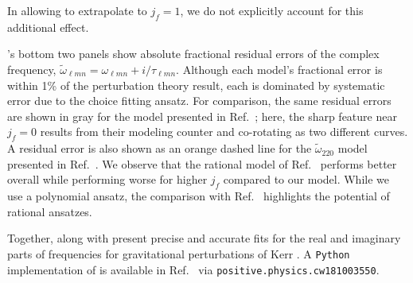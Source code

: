 \documentclass[twocolumn,aps,prd,floatfix,preprintnumbers,a4paper,nofootinbib,
superscriptaddress,10pt]{revtex4-1}
\newcommand{\cw}{\tilde{\omega}}
\def\jf{j_f}
\def\lmn{_{\ell m n}}
\begin{document}
%
In allowing  to extrapolate to $\jf=1$, we do not explicitly account for this additional effect.
%
\par {}'s bottom two panels show absolute fractional residual errors of the complex frequency, $\cw\lmn = \omega\lmn + i/\tau\lmn$.
%
Although each model's fractional error is within 1\% of the perturbation theory result, each is dominated by systematic error due to the choice fitting ansatz.
%
For comparison, the same residual errors are shown in gray for the model presented in Ref.~\cite{Berti:2005ys};
%
here, the sharp feature near $\jf=0$ results from their modeling counter and co-rotating \qnm{} as two different curves. A residual error is also shown as an orange dashed line for the $\cw_{220}$ model presented in Ref.~\cite{Nagar:2018zoe}. We observe that the rational model of Ref.~\cite{Nagar:2018zoe} performs better overall while performing worse for higher $\jf$ compared to our model. While we use a polynomial ansatz, the comparison with Ref.~\cite{Nagar:2018zoe} highlights the potential of rational ansatzes.
%
\par Together,  along with  present precise and accurate fits for the real and imaginary parts of \qnm{} frequencies for gravitational perturbations of Kerr .
%
A \texttt{Python} implementation of  is available in Ref.~\cite{lionel_london_2018_1402516} via \texttt{positive.physics.cw181003550}.
%
%
\end{document}
